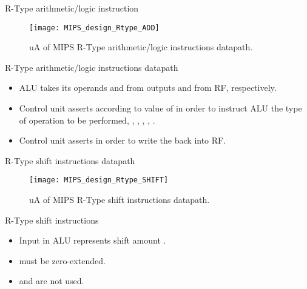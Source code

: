 \documentclass[]{slides}
\begin{document}
% 
\begin{frame}{R-Type arithmetic/logic instruction}
  \begin{figure}
  \centering
  \texttt{[image: MIPS\_design\_Rtype\_ADD]}
  \vspace{-1pt}
  \caption{\ac{uA} of \ac{MIPS} R-Type arithmetic/logic instructions datapath.}
  \label{Figure:non_pipelined_MIPS_Rtype_ADD}
  \end{figure}
\end{frame}

% 
\begin{frame}{R-Type arithmetic/logic instructions datapath}
\begin{itemize}
\item \ac{ALU} takes its operands  and  from outputs  and  from \ac{RF}, respectively.
\item Control unit asserts  according to value of  in order to instruct \ac{ALU} the type of operation to be performed, \ie, , , , \etc. 
\item Control unit asserts  in order to write the  back into \ac{RF}.
\end{itemize}
\end{frame}

% 
\begin{frame}{R-Type shift instructions datapath}
  \begin{figure}
  \centering
  \texttt{[image: MIPS\_design\_Rtype\_SHIFT]}
  \vspace{-3pt}
  \caption{\ac{uA} of \ac{MIPS} R-Type shift instructions datapath.}
  \label{Figure:non_pipelined_MIPS_Rtype_SHIFT}
  \end{figure}
\end{frame}

% 
\begin{frame}{R-Type shift instructions}
\begin{itemize}
\item Input  in \ac{ALU} represents shift amount .
\item {} must be zero-extended.
\item {} and  are not used.
\end{itemize}
\end{frame}
\end{document}
